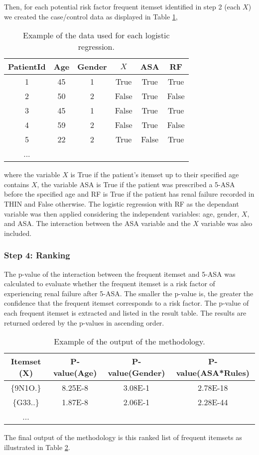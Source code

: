 \documentclass{llncs}
\begin{document}
Then, for each potential risk factor frequent itemset identified in step 2 (each $X$) we created the case/control data as displayed in Table \ref{lg},
\begin{table} \centering
\caption{Example of the data used for each logistic regression.}
\label{lg}
\begin{tabular}{cccccc}
PatientId & Age & Gender & $X$ & ASA & RF \\ \hline \hline
1 & 45 & 1 & True & True & True \\
2 & 50 & 2 & False & True & False \\
3& 45 & 1 & False & True & True \\
4& 59 & 2 & False & True & False \\
5 & 22 & 2 & True & False & True \\
... & & & & &\\
\end{tabular}
\end{table} 
where the variable $X$ is True if the patient's itemset up to their specified age contains $X$, the variable ASA is True if the patient was prescribed a 5-ASA before the specified age and RF is True if the patient has renal failure recorded in THIN and False otherwise. The logistic regression with RF as the dependant variable was then applied considering the independent variables: age, gender, $X$, and ASA. The interaction between the ASA variable and the $X$ variable was also included. 

\subsubsection{Step 4: Ranking}
The p-value of the interaction between the frequent itemset and 5-ASA was calculated to evaluate whether the frequent itemset is a risk factor of experiencing renal failure after 5-ASA. The smaller the p-value is, the greater the confidence that the frequent itemset corresponds to a risk factor. The p-value of each frequent itemset is extracted and listed in the result table. The results are returned ordered by the p-values in ascending order. 
\begin{table} \centering 
\caption{Example of the output of the methodology.}
\label{output}
\begin{tabular}{cccc}
Itemset (X) & P-value(Age) & P-value(Gender) & P-value(ASA*Rules) \\ \hline \hline
$\{$9N1O.$\}$ & 8.25E-8 & 3.08E-1 & 2.78E-18 \\
$\{$G33..$\}$ & 1.87E-8 & 2.06E-1 & 2.28E-44 \\
... & & &\\
\end{tabular}
\end{table}
The final output of the methodology is this ranked list of frequent itemsets as illustrated in Table \ref{output}.
\end{document}
